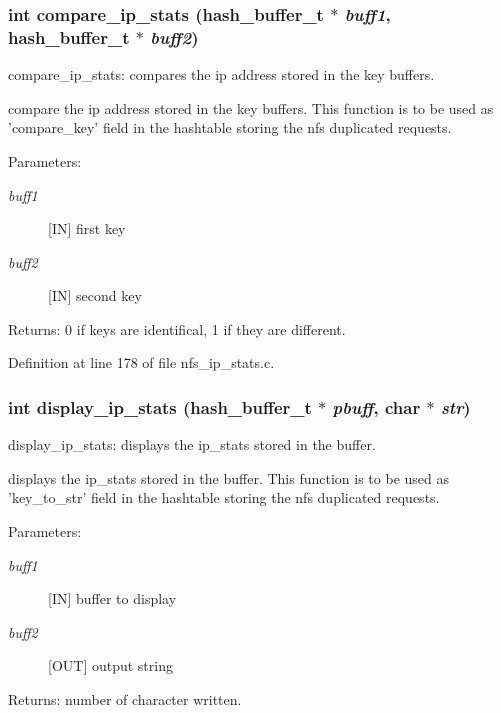\subsubsection{\setlength{\rightskip}{0pt plus 5cm}int compare\_\-ip\_\-stats (hash\_\-buffer\_\-t $\ast$ {\em buff1}, hash\_\-buffer\_\-t $\ast$ {\em buff2})}\label{nfs__ip__stats_8c_a4}


compare\_\-ip\_\-stats: compares the ip address stored in the key buffers.

compare the ip address stored in the key buffers. This function is to be used as 'compare\_\-key' field in the hashtable storing the nfs duplicated requests.

\begin{Desc}
\item[Parameters:]
\begin{description}
\item[{\em buff1}][IN] first key \item[{\em buff2}][IN] second key\end{description}
\end{Desc}
\begin{Desc}
\item[Returns:]0 if keys are identifical, 1 if they are different. \end{Desc}


Definition at line 178 of file nfs\_\-ip\_\-stats.c.
\subsubsection{\setlength{\rightskip}{0pt plus 5cm}int display\_\-ip\_\-stats (hash\_\-buffer\_\-t $\ast$ {\em pbuff}, char $\ast$ {\em str})}\label{nfs__ip__stats_8c_a5}


display\_\-ip\_\-stats: displays the ip\_\-stats stored in the buffer.

displays the ip\_\-stats stored in the buffer. This function is to be used as 'key\_\-to\_\-str' field in the hashtable storing the nfs duplicated requests.

\begin{Desc}
\item[Parameters:]
\begin{description}
\item[{\em buff1}][IN] buffer to display \item[{\em buff2}][OUT] output string\end{description}
\end{Desc}
\begin{Desc}
\item[Returns:]number of character written. \end{Desc}


